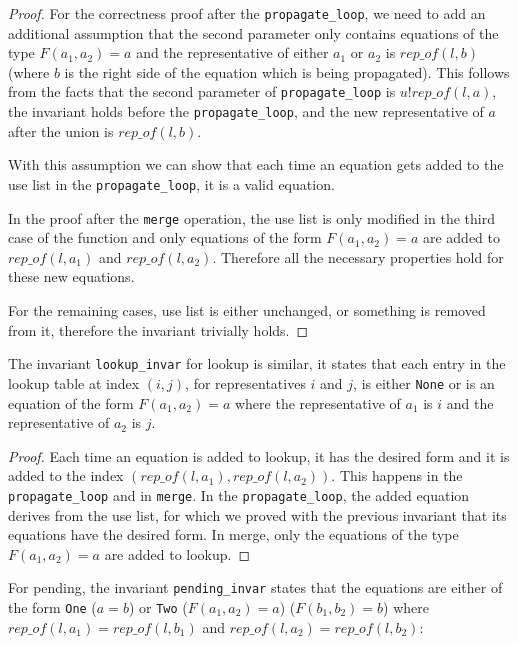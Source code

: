 \begin{proof}
For the correctness proof after the \lstinline{propagate_loop}, we need to add an additional assumption that the second parameter only contains equations of the type $F(a_1, a_2) = a$ and the representative of either $a_1$ or $a_2$ is $rep\_of(l, b)$ (where $b$ is the right side of the equation which is being propagated). This follows from the facts that the second parameter of \lstinline{propagate_loop} is $u ! rep\_of(l, a)$, the invariant holds before the \lstinline{propagate_loop}, and the new representative of $a$ after the union is $rep\_of(l, b)$.

With this assumption we can show that each time an equation gets added to the use list in the \lstinline{propagate_loop}, it is a valid equation.

In the proof after the \lstinline{merge} operation, the use list is only modified in the third case of the function and only equations of the form $F(a_1, a_2) = a$ are added to $rep\_of(l, a_1)$  and $rep\_of(l, a_2)$. Therefore all the necessary properties hold for these new equations.

For the remaining cases, use list is either unchanged, or something is removed from it, therefore the invariant trivially holds.
\end{proof}

The invariant \lstinline|lookup_invar| for lookup is similar, it states that each entry in the lookup table at index $(i, j)$, for representatives $i$ and $j$, is either \lstinline{None} or is an equation of the form $F(a_1, a_2) = a$ where the representative of $a_1$ is $i$ and the representative of $a_2$ is $j$.

\begin{proof}
Each time an equation is added to lookup, it has the desired form and it is added to the index $(rep\_of(l, a_1), rep\_of(l, a_2))$. This happens in the \lstinline{propagate_loop} and in \lstinline{merge}. In the \lstinline{propagate_loop}, the added equation derives from the use list, for which we proved with the previous invariant that its equations have the desired form. In merge, only the equations of the type $F(a_1, a_2) = a$ are added to lookup.
\end{proof}

For pending, the invariant \lstinline|pending_invar| states that the equations are either of the form \lstinline{One} ($a = b$) or \lstinline{Two} ($F(a_1, a_2) = a$) ($F(b_1, b_2) = b$) where $rep\_of(l, a_1) = rep\_of(l, b_1)$ and $rep\_of(l, a_2) = rep\_of(l, b_2)$:

